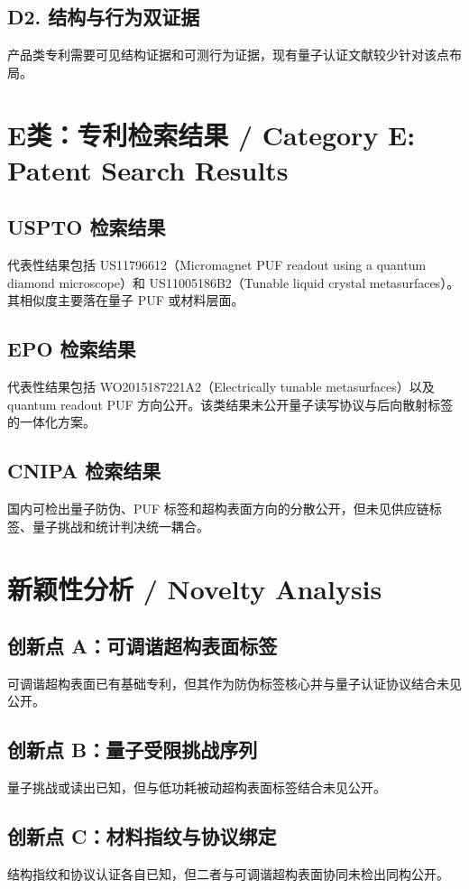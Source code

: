﻿\documentclass[12pt,a4paper]{article}
\begin{document}
\subsection{D2. 结构与行为双证据}
产品类专利需要可见结构证据和可测行为证据，现有量子认证文献较少针对该点布局。

\section{E类：专利检索结果 / Category E: Patent Search Results}
\subsection{USPTO 检索结果}
代表性结果包括 US11796612（Micromagnet PUF readout using a quantum diamond microscope）和 US11005186B2（Tunable liquid crystal metasurfaces）。其相似度主要落在量子 PUF 或材料层面。

\subsection{EPO 检索结果}
代表性结果包括 WO2015187221A2（Electrically tunable metasurfaces）以及 quantum readout PUF 方向公开。该类结果未公开量子读写协议与后向散射标签的一体化方案。

\subsection{CNIPA 检索结果}
国内可检出量子防伪、PUF 标签和超构表面方向的分散公开，但未见供应链标签、量子挑战和统计判决统一耦合。

\section{新颖性分析 / Novelty Analysis}
\subsection{创新点 A：可调谐超构表面标签}
可调谐超构表面已有基础专利，但其作为防伪标签核心并与量子认证协议结合未见公开。

\subsection{创新点 B：量子受限挑战序列}
量子挑战或读出已知，但与低功耗被动超构表面标签结合未见公开。

\subsection{创新点 C：材料指纹与协议绑定}
结构指纹和协议认证各自已知，但二者与可调谐超构表面协同未检出同构公开。
\end{document}
